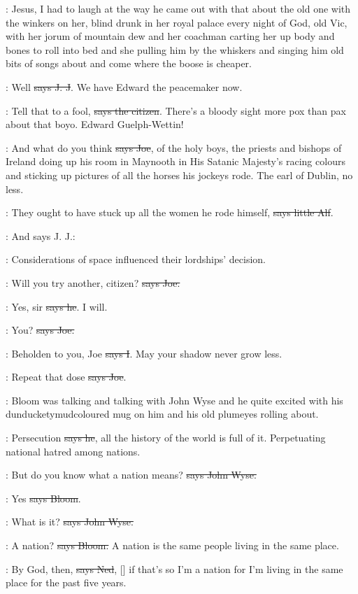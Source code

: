 \Nq:
Jesus, I had to laugh at the way he came out with that about the old one
with the winkers on her, blind drunk in her royal palace every night of
God, old Vic, with her jorum of mountain dew and her coachman carting her
up body and bones to roll into bed and she pulling him by the whiskers
and singing him old bits of songs about 
and come where the boose is cheaper.

\jjom:
Well \sout{says J. J}.
We have Edward the peacemaker now.

\citizen:
Tell that to a fool, \sout{says the citizen}.
There's a bloody sight more pox
than pax about that boyo. Edward Guelph-Wettin!

\joe:
And what do you think \sout{says Joe}, of the holy boys, the priests and
bishops of Ireland doing up his room in Maynooth in His Satanic Majesty's
racing colours and sticking up pictures of all the horses his jockeys
rode. The earl of Dublin, no less.

\bergan:
They ought to have stuck up all the women
he rode himself, \sout{says little
Alf}.

\Nq:
And says J. J.:

\jjom:
Considerations of space influenced
their lordships' decision.

\joe:
Will you try another, citizen? \sout{says Joe.}

\citizen:
Yes, sir \sout{says he}. I will.

\joe:
You? \sout{says Joe.}

:
Beholden to you, Joe \sout{says I}.
May your shadow never grow less.

\joe:
Repeat that dose \sout{says Joe}.

\Nq:
Bloom was talking and talking with John Wyse and he quite excited with
his dunducketymudcoloured mug on him and his old plumeyes rolling about.

\Bloom:
Persecution \sout{says he},
all the history of the world is full of it.
Perpetuating national hatred among nations.

\johnwyse:
But do you know what a nation means?
\sout{says John Wyse.}

\Bloom:
Yes \sout{says Bloom}.

\johnwyse:
What is it? \sout{says John Wyse.}

\Bloom:
A nation? \sout{says Bloom.}
A nation is the same people living in the same place.

\lambert:
By God, then, \sout{says Ned},
[] if that's so I'm a nation for I'm
living in the same place for the past five years.

